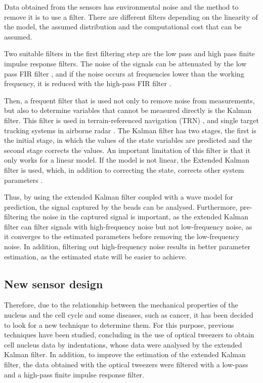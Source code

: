 \documentclass[12pt, a4paper]{article} %
\begin{document}
Data obtained from the sensors has environmental noise and the method to remove it is to use a filter. There are different filters depending on the linearity of the model, the assumed distribution and the computational cost that can be assumed. 

\setlength{\parskip}{4mm}

Two suitable filters in the first filtering step are the low pass and high pass finite impulse response filters. The noise of the signals can be attenuated by the low pass FIR filter \cite{rabiner1973approximate}, and if the noise occurs at frequencies lower than the working frequency, it is reduced with the high-pass FIR filter \cite{mondal2012novel}.

Then, a frequent filter that is used not only to remove noise from measurements, but also to determine variables that cannot be measured directly is the Kalman filter. This filter is used in terrain-referenced navigation (TRN) \cite{kim2018introduction}, and single target tracking systems in airborne radar \cite{pearson1974Kalman}. The Kalman filter has two stages, the first is the initial stage, in which the values of the state variables are predicted and the second stage corrects the values. An important limitation of this filter is that it only works for a linear model. If the model is not linear, the Extended Kalman filter is used, which, in addition to correcting the state, corrects other system parameters \cite{ribeiro2004Kalman}.

Thus, by using the extended Kalman filter coupled with a wave model for prediction, the signal captured by the beads can be analysed. Furthermore, pre-filtering the noise in the captured signal is important, as the extended Kalman filter can filter signals with high-frequency noise but not low-frequency noise, as it converges to the estimated parameters before removing the low-frequency noise. In addition, filtering out high-frequency noise results in better parameter estimation, as the estimated state will be easier to achieve.

\setlength{\parskip}{0mm}

\subsection{New sensor design}

Therefore, due to the relationship between the mechanical properties of the nucleus and the cell cycle and some diseases, such as cancer, it has been decided to look for a new technique to determine them. For this purpose, previous techniques have been studied, concluding in the use of optical tweezers to obtain cell nucleus data by indentations, whose data were analysed by the extended Kalman filter. In addition, to improve the estimation of the extended Kalman filter, the data obtained with the optical tweezers were filtered with a low-pass and a high-pass finite impulse response filter.
 
\end{document}
